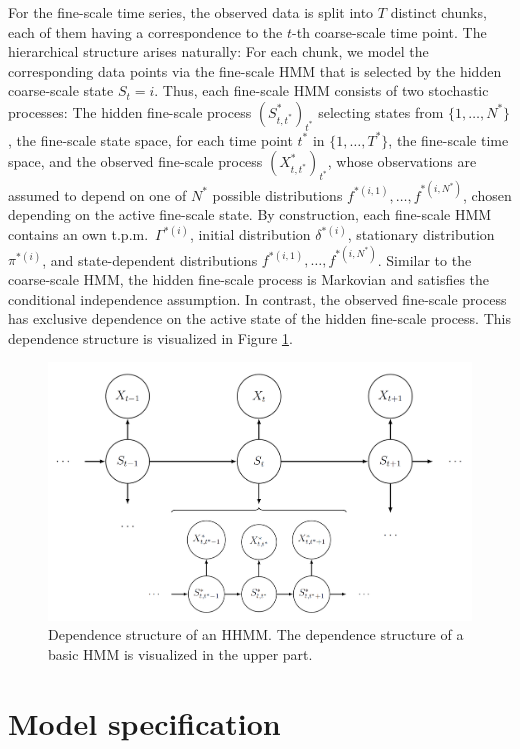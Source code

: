\documentclass[article,shortnames]{jss}
\begin{document}
For the fine-scale time series, the observed data is split into $T$ distinct chunks, each of them having a correspondence to the $t$-th coarse-scale time point. The hierarchical structure arises naturally: For each chunk, we model the corresponding data points via the fine-scale HMM that is selected by the hidden coarse-scale state $S_t = i$. Thus, each fine-scale HMM consists of two stochastic processes: The hidden fine-scale process $(S^*_{t,t^*})_{t^*}$ selecting states from $\{1,\dots,N^*\}$, the fine-scale state space, for each time point $t^*$ in $\{1,\dots,T^*\}$, the fine-scale time space, and the observed fine-scale process $(X^*_{t,t^*})_{t^*}$, whose observations are assumed to depend on one of $N^*$ possible distributions $f^{*(i,1)},\dots,f^{*(i,N^*)}$, chosen depending on the active fine-scale state. By construction, each fine-scale HMM contains an own t.p.m.\ $\Gamma^{*(i)}$, initial distribution $\delta^{*(i)}$, stationary distribution $\pi^{*(i)}$, and state-dependent distributions $f^{*(i,1)},\dots,f^{*(i,N^*)}$. Similar to the coarse-scale HMM, the hidden fine-scale process is Markovian and satisfies the conditional independence assumption. In contrast, the observed fine-scale process has exclusive dependence on the active state of the hidden fine-scale process. This dependence structure is visualized in Figure \ref{fig:hhmm}.

\begin{figure}
  \centering
  \includegraphics{hhmm.png}
  \caption{Dependence structure of an HHMM. The dependence structure of a basic HMM is visualized in the upper part.}
  \label{fig:hhmm}
\end{figure}

\section{Model specification} \label{sec:model_specification} %
\end{document}
